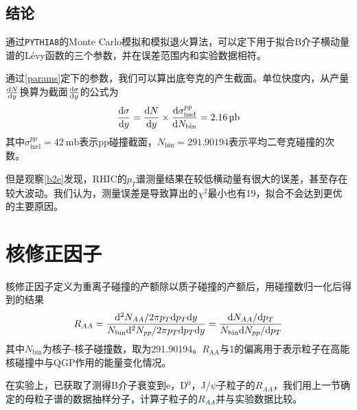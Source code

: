 \documentclass[12pt, a4paper]{ctexart}
\begin{document}
\subsection{结论} %
\label{sub:结论}

通过\texttt{PYTHIA8}\cite{Sj_strand_2015}的Monte Carlo模拟和模拟退火算法，可以定下用于拟合B介子横动量谱的L\'evy函数的三个参数，并在误差范围内和实验数据相符。
\par 通过\cref{params}定下的参数，我们可以算出底夸克的产生截面。单位快度内，从产量$\frac{\mathrm{d} N}{\mathrm{d} y}$换算为截面$\frac{\mathrm{d} \sigma}{\mathrm{d} y}$的公式为
\begin{equation}
	\eddon{\sigma}{y} = \eddon{N}{y}\times\eddon{\sigma^{pp}_{\text{inel}}}{N_\text{bin}} = \SI{2.16}{\micro\barn}
\end{equation}
其中$\sigma^{pp}_{\text{inel}}=\SI{42}{\milli\barn}$表示pp碰撞截面，$N_\text{bin}=\num{291.90194}$表示平均二夸克碰撞的次数\cite{Zhang:2008gb}。
\par 但是观察\cref{b2e}发现，RHIC的$p_T$谱测量结果在较低横动量有很大的误差，甚至存在较大波动。我们认为，测量误差是导致算出的$\chi^2$最小也有19，拟合不会达到更优的主要原因。




\section{核修正因子} %
\label{sec:核修正因子}

核修正因子定义为重离子碰撞的产额除以质子碰撞的产额后，用碰撞数归一化后得到的结果
\begin{equation}\label{raa}
	R_{AA} = \frac{\mathrm{d} ^2N_{AA}/2\pi p_T\mathrm{d} p_T\mathrm{d} y}{N_\text{bin}\mathrm{d} ^2N_{pp}/2\pi p_T\mathrm{d} p_T\mathrm{d} y} = \frac{\mathrm{d} N_{AA}/\mathrm{d} p_T}{N_\text{bin}\mathrm{d} N_{pp}/\mathrm{d} p_T}
\end{equation}
其中$N_\text{bin}$为核子-核子碰撞数，取为\num{291.90194}。$R_\text{AA}$与1的偏离用于表示粒子在高能核碰撞中与QGP作用的能量变化情况。\par
在实验上，已获取了测得B介子衰变到e，D$^0$，J/$\psi$子粒子的$R_{AA}$，我们用上一节确定的母粒子谱的数据抽样分子，计算子粒子的$R_{AA}$并与实验数据比较。
\end{document}
